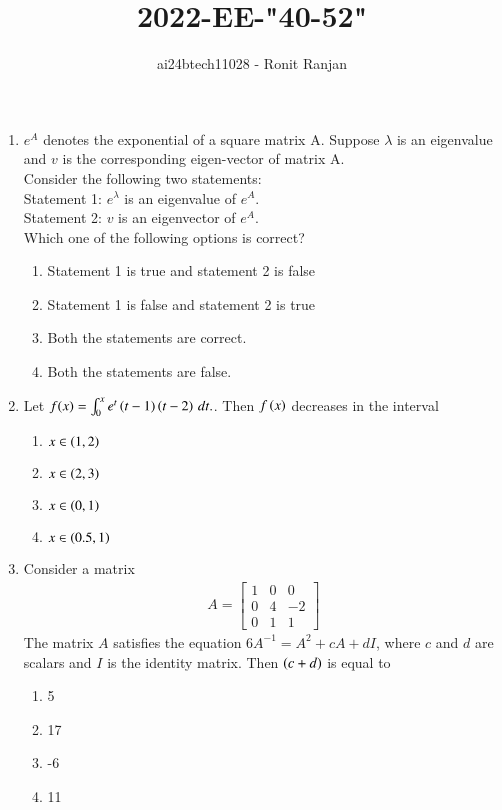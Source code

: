 \documentclass[journal,12pt,onecolumn]{IEEEtran}
\theoremstyle{remark}
\begin{document}

\vspace{3cm}

\title{2022-EE-"40-52"}
\author{ai24btech11028 - Ronit Ranjan}
\maketitle
\bigskip

\begin{enumerate}
    \item $e^A$  denotes the exponential of a square matrix A. Suppose $\lambda$ is an eigenvalue and $v$ is the corresponding eigen-vector of matrix A. \\
    Consider the following two statements:\\
    Statement 1: $e^{\lambda}$ is an eigenvalue of $e^A$.\\
    Statement 2: $v$ is an eigenvector of $e^A$.\\
    Which one of the following options is correct? 
    \begin{enumerate}
        \item Statement 1 is true and statement 2 is false
        \item Statement 1 is false and statement 2 is true
        \item Both the statements are correct. 
        \item Both the statements are false. 
    \end{enumerate}

    \item Let $f(x) = \int_0^x e^t \left(t - 1\right)\left(t - 2\right) \, dt.$. Then $f\left(x\right)$ decreases in the interval
    \begin{enumerate}
        \item $x \in \left(1,2\right)$
        \item $x \in \left(2,3\right)$
        \item $x \in \left(0,1\right)$
        \item $x \in \left(0.5,1\right)$
    \end{enumerate}

    \item Consider a matrix
    \begin{align*}
        A = 
            \begin{bmatrix}
            1 & 0 & 0 \\
            0 & 4 & -2 \\
            0 & 1 & 1
            \end{bmatrix}        
    \end{align*}
    The matrix $A$ satisfies the equation $6A^{-1} = A^2 + cA + dI$, where $c$ and $d$ are scalars and $I$ is the identity matrix. Then $\left(c + d\right)$ is equal to
    \begin{enumerate}
        \item 5
        \item 17
        \item -6
        \item 11
    \end{enumerate}


\end{enumerate}
\end{document}
